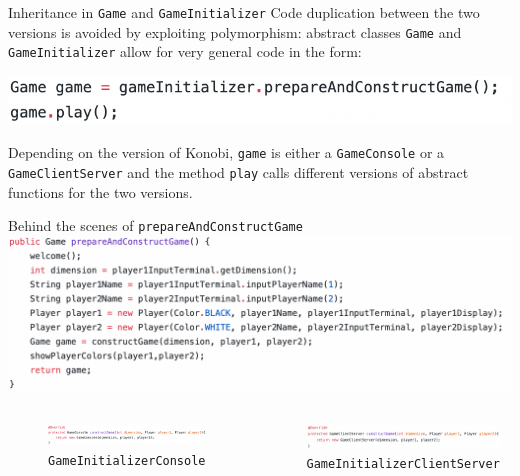 \documentclass{beamer}
\begin{document}
\begin{frame}{Inheritance in \texttt{Game} and \texttt{GameInitializer}}
Code duplication between the two versions is avoided by exploiting polymorphism: abstract classes \texttt{Game} and \texttt{GameInitializer} allow for very general code in the form:
\\
\begin{center} \includegraphics[scale=0.5]{images/gameplay.png}\end{center}

Depending on the version of Konobi, \texttt{game} is either a \texttt{GameConsole} or a \texttt{GameClientServer} and the method \texttt{play} calls different versions of abstract functions for the two versions.
\end{frame}

\begin{frame}{Behind the scenes of \texttt{prepareAndConstructGame}}
\center \includegraphics[scale=0.4]{images/prepareandconstruct.png}
\begin{columns}\hspace{-0.5cm}
			\begin{figure}
				\includegraphics[scale=0.24]{images/constructconsole.png}
				\caption*{\hspace{-0.2cm}\texttt{GameInitializerConsole}}
			\end{figure}
					
			\begin{figure}
				\includegraphics[scale=0.24]{images/constructcs.png}
				\caption*{\texttt{GameInitializerClientServer}}
			\end{figure}
		
	\end{columns}

\end{frame}
\end{document}
